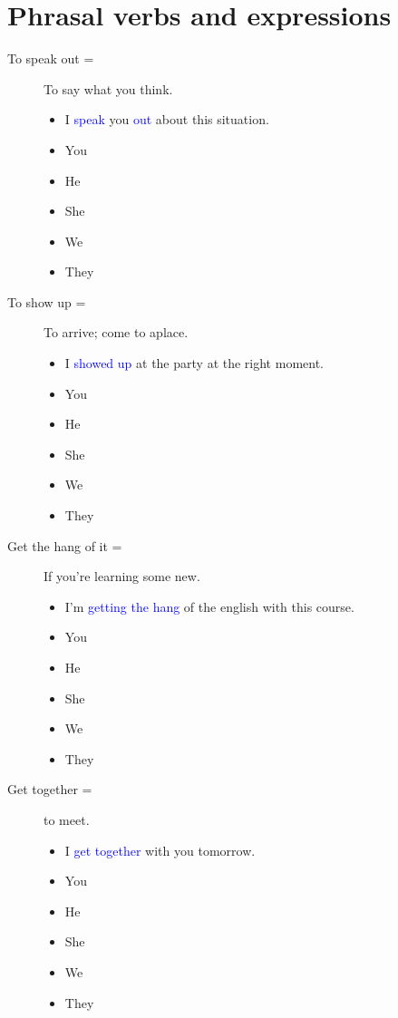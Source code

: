 \section{Phrasal verbs and expressions}
\begin{multicols}{2}
\begin{description}
\item [To speak out =] To say what you think.
  \begin{itemize}
  \item I \textcolor{blue}{speak} you \textcolor{blue}{out} about this situation.
  \item You
  \item He
  \item She
  \item We
  \item They
  \end{itemize}
\item [To show up =] To arrive; come to aplace.
  \begin{itemize}
  \item I \textcolor{blue}{showed up} at the party at the right moment.
  \item You
  \item He
  \item She
  \item We
  \item They
  \end{itemize}
\item [Get the hang of it =] If you're learning some new.
  \begin{itemize}
  \item I'm \textcolor{blue}{getting the hang} of the english with this course.
  \item You
  \item He
  \item She
  \item We
  \item They
  \end{itemize}
\item [Get together =] to meet.
  \begin{itemize}
  \item I \textcolor{blue}{get together} with you tomorrow.
  \item You
  \item He
  \item She
  \item We
  \item They
  \end{itemize}

\end{description}
\end{multicols}
